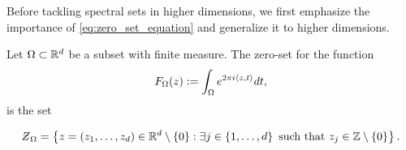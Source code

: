 \documentclass[../thesis.tex]{subfiles}
\begin{document}
Before tackling spectral sets in higher dimensions, we first emphasize the importance of \cref{eq:zero_set_equation} and generalize it to higher dimensions. 
\begin{lemma}\label{lem:zero_set_jp_1_5}
    Let $\Omega\subset\mathbb{R}^d$ be a subset with finite measure. The zero-set for the function
    \begin{equation*}
        F_{\Omega} (z):= \int_\Omega e^{2 \pi i \langle z,t\rangle} dt,
    \end{equation*}
    is the set


    \begin{equation*}
        \Zstroke_{\Omega} = \braqMed{ z = \brac{z_1,\dots,z_d}\in \R^d \setminus \braqMed{0} : \exists \space j \in \braqMed{1,\dots, d} \text{ such that } z_j \in  \intnozero}.
    \end{equation*}
\end{lemma}

\end{document}

